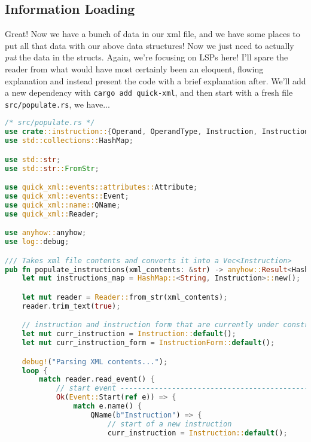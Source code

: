 \subsection{Information Loading}

Great! Now we have a bunch of data in our xml file, and we have some places to put all that data with our above data structures! Now we just need to actually \textit{put} the data in the structs. Again, we're focusing on LSPs here! I'll spare the reader from what would have most certainly been an eloquent, flowing explanation and instead present the code with a brief explanation after. We'll add a new dependency with \texttt{cargo add quick-xml}, and then start with a fresh file \texttt{src/populate.rs}, we have...

\begin{lstlisting}[language=rust]
/* src/populate.rs */
use crate::instruction::{Operand, OperandType, Instruction, InstructionForm};
use std::collections::HashMap;

use std::str;
use std::str::FromStr;

use quick_xml::events::attributes::Attribute;
use quick_xml::events::Event;
use quick_xml::name::QName;
use quick_xml::Reader;

use anyhow::anyhow;
use log::debug;

/// Takes xml file contents and converts it into a Vec<Instruction>
pub fn populate_instructions(xml_contents: &str) -> anyhow::Result<HashMap<String, Instruction>> {
    let mut instructions_map = HashMap::<String, Instruction>::new();

    let mut reader = Reader::from_str(xml_contents);
    reader.trim_text(true);

    // instruction and instruction form that are currently under construction
    let mut curr_instruction = Instruction::default();
    let mut curr_instruction_form = InstructionForm::default();

    debug!("Parsing XML contents...");
    loop {
        match reader.read_event() {
            // start event ------------------------------------------------------------------------
            Ok(Event::Start(ref e)) => {
                match e.name() {
                    QName(b"Instruction") => {
                        // start of a new instruction
                        curr_instruction = Instruction::default();


\end{lstlisting}
